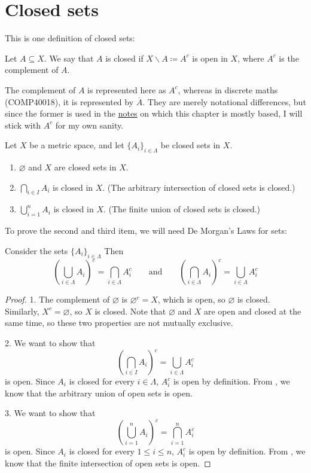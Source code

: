 \section{Closed sets}
This is one definition of closed sets:
\begin{definition}
  Let $A \subseteq X$. We say that $A$ is closed if $X \backslash A \coloneqq A ^ c$ is open in $X$, where $A ^ c$ is the complement of $A$.
\end{definition}
The complement of $A$ is represented here as $A ^ c$, whereas in discrete maths (COMP40018), it is represented by $\overline{A}$. They are merely notational differences, but since the former is used in the \href{https://web.mit.edu/paigeb/www/18.S097/}{notes} on which this chapter is mostly based, I will stick with $A ^ c$ for my own sanity.
\begin{theorem}
  Let $X$ be a metric space, and let $\{A_i\}_{i \in \Lambda}$ be closed sets in $X$.
  \begin{enumerate}
    \item $\varnothing$ and $X$ are closed sets in $X$.
    \item $\bigcap_{i \in I} A_i$ is closed in $X$. (The arbitrary intersection of closed sets is closed.)
    \item $\bigcup_{i = 1}^n A_i$ is closed in $X$. (The finite union of closed sets is closed.)
  \end{enumerate}
\end{theorem}
To prove the second and third item, we will need De Morgan's Laws for sets:
\begin{theorem}[De Morgan's]
  Consider the sets $\{A_i\}_{i \in \Lambda}$ Then
  \[
    {\left(\bigcup_{i \in \Lambda} A_i \right)} ^ c = \bigcap_{i \in \Lambda} A_i^c \qquad \text{and} \qquad {\left(\bigcap_{i \in \Lambda} A_i \right)} ^ c = \bigcup_{i \in \Lambda} A_i^c
  \]
\end{theorem}
\begin{proof}
  1. The complement of $\varnothing$ is $\varnothing ^ c = X$, which is open, so $\varnothing$ is closed. Similarly, $X ^ c = \varnothing$, so $X$ is closed. Note that $\varnothing$ and $X$ are open and closed at the same time, so these two properties are not mutually exclusive.

  2. We want to show that 
  \[
    {\left(\bigcap_{i \in I} A_i\right)} ^ c = \bigcup_{i \in \Lambda} A_i^c
  \]
  is open. Since $A_i$ is closed for every $i \in \Lambda$, $A_i^c$ is open by definition. From , we know that the arbitrary union of open sets is open.
  
  3. We want to show that
  \[
    {\left(\bigcup_{i = 1}^n A_i \right)} ^ c = \bigcap_{i = 1}^n A_i^c
  \]
  is open. Since $A_i$ is closed for every $1 \leq i \leq n$, $A_i^c$ is open by definition. From , we know that the finite intersection of open sets is open.
\end{proof}
